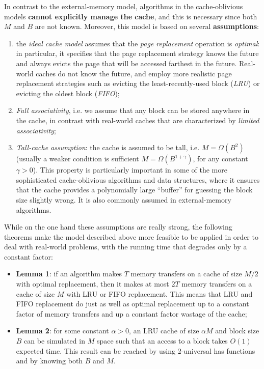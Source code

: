 In contrast to the external-memory model, algorithms in the cache-oblivious models \textbf{cannot explicitly manage the cache}, and this is necessary since both $M$ and $B$ are not known. Moreover, this model is based on several \textbf{assumptions}:

\begin{enumerate}
    \item the \textit{ideal cache model} assumes that the \textit{page replacement} operation is \textit{optimal}: in particular, it specifies that the page replacement strategy knows the future and always evicts the page that will be accessed farthest in the future. Real-world caches do not know the future, and employ more realistic page replacement strategies such as evicting the least-recently-used block (\textit{LRU}) or evicting the oldest block (\textit{FIFO});
    \item \textit{Full associativity}, i.e. we assume that any block can be stored anywhere in the cache, in contrast with real-world caches that are characterized by \textit{limited associativity};
    \item \textit{Tall-cache assumption}: the cache is assumed to be tall, i.e. $M = \Omega(B^2)$ (usually a weaker condition is sufficient $M = \Omega(B^{1 + \gamma})$, for any constant $\gamma > 0$). This property is particularly important in some of the more sophisticated cache-oblivious algorithms and data structures, where it ensures that the cache provides a polynomially large “buffer” for guessing the block size slightly wrong. It is also commonly assumed in external-memory algorithms.
\end{enumerate}

While on the one hand these assumptions are really strong, the following theorems make the model described above more feasible to be applied in order to deal with real-world problems, with the running time that degrades only by a constant factor:

\begin{itemize}
    \item \textbf{Lemma 1}: if an algorithm makes $T$ memory transfers on a cache of size $M/2$ with optimal replacement, then it makes at most $2T$ memory transfers on a cache of size $M$ with LRU or FIFO replacement. This means that LRU and FIFO replacement do just as well as optimal replacement up to a constant factor of memory transfers and up a constant factor wastage of the cache;
    \item \textbf{Lemma 2}: for some constant $\alpha > 0$, an LRU cache of size $\alpha M$ and block size $B$ can be simulated in $M$ space such that an access to a block takes $O(1)$ expected time. This result can be reached by using 2-universal has functions and by knowing both $B$ and $M$.
\end{itemize}


